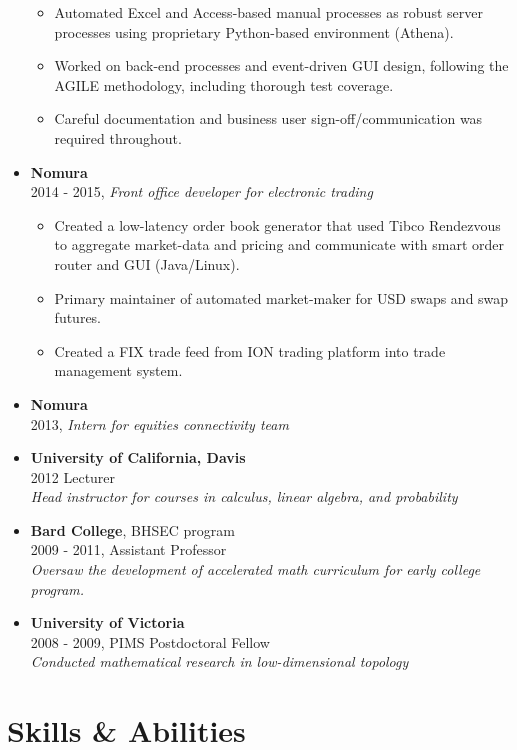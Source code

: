 \documentclass[margin]{res}
\def\tightlist{}
\begin{document}
\begin{resume}
\begin{itemize}
  \begin{itemize}
  \tightlist
  \item
    Automated Excel and Access-based manual processes as robust server
    processes using proprietary Python-based environment (Athena).
  \item
    Worked on back-end processes and event-driven GUI design, following
    the AGILE methodology, including thorough test coverage.
  \item
    Careful documentation and business user sign-off/communication was
    required throughout.
  \end{itemize}
\item
  \textbf{Nomura}\\
  2014 - 2015, \emph{Front office developer for electronic trading}

  \begin{itemize}
  \tightlist
  \item
    Created a low-latency order book generator that used Tibco
    Rendezvous to aggregate market-data and pricing and communicate with
    smart order router and GUI (Java/Linux).
  \item
    Primary maintainer of automated market-maker for USD swaps and swap
    futures.
  \item
    Created a FIX trade feed from ION trading platform into trade
    management system.
  \end{itemize}
\item
  \textbf{Nomura}\\
  2013, \emph{Intern for equities connectivity team}
\item
  \textbf{University of California, Davis}\\
  2012 Lecturer\\
  \emph{Head instructor for courses in calculus, linear algebra, and
  probability}
\item
  \textbf{Bard College}, BHSEC program\\
  2009 - 2011, Assistant Professor\\
  \emph{Oversaw the development of accelerated math curriculum for early
  college program.}
\item
  \textbf{University of Victoria}\\
  2008 - 2009, PIMS Postdoctoral Fellow\\
  \emph{Conducted mathematical research in low-dimensional topology}
\end{itemize}

\section{Skills \& Abilities}\label{skills-abilities}


\end{resume}
\end{document}

